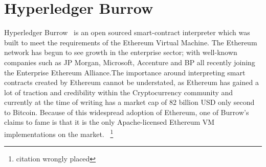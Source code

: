 \section{Hyperledger Burrow}

Hyperledger Burrow~\cite{hid-sp18-414-Behlendorf} is an open sourced smart-contract interpreter which
was built to meet the requirements of the Ethereum Virtual
Machine. The Ethereum network has begun to see growth in the
enterprise sector; with well-known companies such as JP Morgan,
Microsoft, Accenture and BP all recently joining the Enterprise
Ethereum Alliance.The importance around interpreting
smart contracts created by Ethereum cannot be understated, as Ethereum
has gained a lot of traction and credibility within the Cryptocurrency
community and currently at the time of writing has a market cap of 82
billion USD only second to Bitcoin. Because of this widespread
adoption of Ethereum, one of Burrow’s claims to fame is that it is the
only Apache-licensed Ethereum VM implementations on the
market.~\cite{hid-sp18-414-Hyperledger_Burrow}
\footnote{citation wrongly placed}

